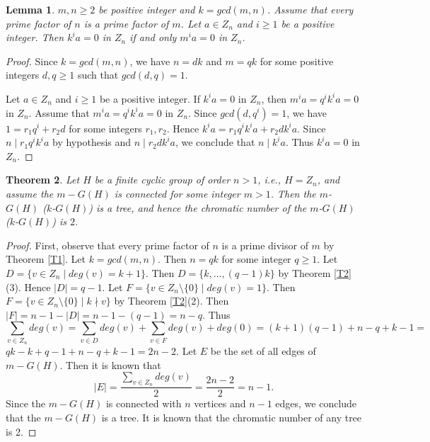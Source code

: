 \documentclass{amsart}
\newtheorem{thm}{Theorem}[section]
\newtheorem{lem}[thm]{Lemma}
\theoremstyle{plain}
\begin{document}
	\begin{lem}\label{L2}
		$m, n \geq 2$ be positive integer and $k = gcd(m, n)$.  Assume that every prime factor of $n$ is a prime factor of $m$. Let $a \in Z_n$ and $i\geq 1$ be a positive integer. Then $k^ia = 0$ in $Z_n$ if and only  $m^ia =0$ in $Z_n$.
	\end{lem}
	\begin{proof}
		Since $k = gcd(m, n)$, we have $n = dk$ and $m = qk$ for some positive integers $d, q\geq 1$ such that $gcd(d, q) = 1$.
		
	Let $a \in Z_n$ and $i\geq 1$ be a positive integer. If $k^ia = 0$ in $Z_n$, then $m^ia = q^ik^ia = 0$ in $Z_n$. Assume that  $m^ia = q^ik^ia = 0$ in $Z_n$. Since $gcd(d, q^i) = 1$, we have $1 = r_1q^i + r_2d$ for some integers $r_1, r_2$. Hence $k^ia = r_1q^ik^ia + r_2dk^ia$. Since $n \mid r_1q^ik^ia$ by hypothesis and $n \mid r_2dk^ia$, we conclude that $n \mid k^ia$. Thus $k^ia = 0$ in $Z_n$.
	\end{proof}
	\begin{thm}\label{T3}
				Let $H$ be a finite cyclic group of order $n > 1$, i.e., $H = Z_n$, and assume the $m-G(H)$ is connected for some integer $m > 1$. Then the $m$-$G(H)$ ($k$-$G(H)$) is a tree, and hence the chromatic number of the $m$-$G (H)$ ($k$-$G(H)$) is $2$.
					\end{thm}
	
	\begin{proof}
		First, observe that every prime factor of $n$ is a prime divisor of $m$ by Theorem \ref{T1}.
		Let $k = gcd(m, n)$. Then $n = qk$ for some integer $q \geq 1$. Let $D = \{v \in Z_n \mid deg(v) = k+1\}$. Then $D = \{k, ... , (q-1)k\}$ by Theorem \ref{T2}(3). Hence $|D| = q - 1$. Let $F = \{v \in Z_n \setminus \{0\} \mid deg(v) = 1\}$. Then $F = \{v \in Z_n \setminus \{0\} \mid k \nmid v\}$ by Theorem \ref{T2}(2). Then $|F| = n - 1 - |D| = n -1 - (q - 1) = n - q$.
		Thus $$\sum_{v \in Z_n} deg(v) = \sum_{v \in D} deg(v) + \sum_{v \in F} deg(v) + deg(0) = (k + 1)(q -1) + n - q + k -1 =$$
		$qk - k + q - 1 + n - q + k -1 = 2n - 2$. Let $E$ be the set of all edges of $m-G(H)$. Then it is known that $$|E| = \frac{\sum_{v \in Z_n} deg(v)}{2} = \frac{2n - 2}{2} = n-1.$$
		Since the $m-G(H)$ is connected with $n$ vertices and $n-1$ edges, we conclude that the $m-G(H)$ is a tree. It is known that the chromatic number of any tree is 2.
	\end{proof}
	
\end{document}
